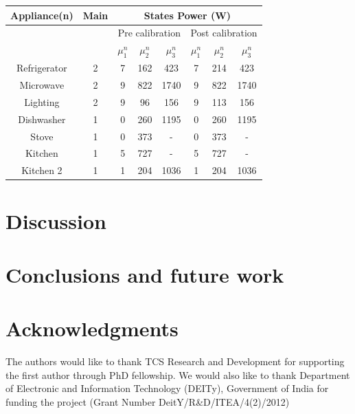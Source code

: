 \documentclass{sig-alternate}
\begin{document}
\begin{tabular}{|c|c|c|c|c|c|c|c|}
\hline
Appliance(n) & Main & \multicolumn{6}{|c|}{States Power (W)}\\
\hline
&&\multicolumn{3}{|c|}{Pre calibration}&\multicolumn{3}{|c|}{Post calibration}\\
\hline
             &  &$\mu^n_1$&$\mu^n_2$&$\mu^n_3$&$\mu^n_1$&$\mu^n_2$&$\mu^n_3$\\[0.1cm]
\hline
Refrigerator & 2& 7&162&423 & 7&214&423\\
Microwave &2& 9&822&1740& 9&822&1740\\
Lighting & 2& 9&96&156&9&113&156\\
Dishwasher & 1& 0&260& 1195 & 0&260& 1195\\
Stove& 1 & 0&373&-& 0&373&-\\
Kitchen & 1& 5&727&-&5&727&-\\
Kitchen 2&1 & 1&204&1036&1&204&1036 \\
%
%
\hline
%
\end{tabular}

\section{Discussion}

\section{Conclusions and future work}
\label{sec:conclusions}

\section{Acknowledgments}
The authors would like to thank TCS Research and Development for supporting the first author through PhD fellowship. We would also like to thank Department of Electronic and Information Technology (DEITy), Government of India for funding the project (Grant Number DeitY/R\&D/ITEA/4(2)/2012)


\end{document}
